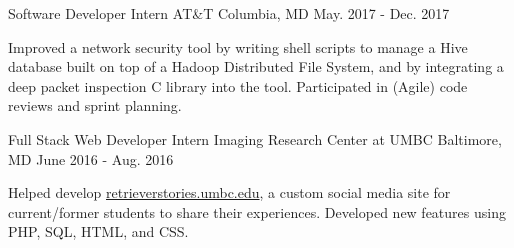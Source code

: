 \begin{cventries}
  \cventry
    {Software Developer Intern} %
    {AT\&T} %
    {Columbia, MD} %
    {May. 2017 - Dec. 2017} %
    {
      \begin{cvitems} %
        \item {Improved a network security tool by writing shell scripts to manage a Hive database built on 
top of a Hadoop Distributed File System, and by integrating a deep packet inspection C 
library into the tool.  Participated in (Agile) code reviews and sprint planning.}
      \end{cvitems}
    }

  \cventry
    {Full Stack Web Developer Intern} %
    {Imaging Research Center at UMBC} %
    {Baltimore, MD} %
    {June 2016 - Aug. 2016} %
    {
      \begin{cvitems} %
        \item {Helped develop \href{https://retrieverstories.umbc.edu}{retrieverstories.umbc.edu}, a custom social media site for current/former students to share their experiences.  Developed new features using PHP, SQL, HTML, and CSS.}
      \end{cvitems}
    }


\end{cventries}
